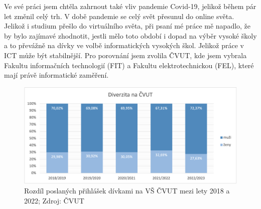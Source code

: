 \documentclass[12pt]{report}			%
\begin{document}
            Ve své práci jsem chtěla zahrnout také vliv pandemie Covid-19, jelikož během pár let změnil celý trh. V době pandemie se celý svět přesunul do online světa. Jelikož i studium přešlo do virtuálního světa, při psaní mé práce mě napadlo, že by bylo zajímavé zhodnotit, jestli mělo toto období i dopad na výběr vysoké školy a to převážně na dívky ve volbě informatických vysokých škol. Jelikož práce v ICT může být stabilnější. Pro porovnání jsem zvolila ČVUT, kde jsem vybrala Fakultu informačních technologií (FIT) a Fakultu elektrotechnickou (FEL), které mají právě informatické zaměření. 
            \begin{figure}[h]
                \centering
                \includegraphics[width=16cm]{Maturitni Prace/images/proc_divek_CVUT_2018-22.png}
                \caption[Vizualizace diverzity na VŠ ČVUT 2018/20]{Rozdíl poslaných přihlášek dívkami na VŠ ČVUT mezi lety 2018 a 2022; Zdroj: ČVUT}
                \label{fig:proc_divek_CVUT_2018-22}
            \end{figure}
            
\end{document}
